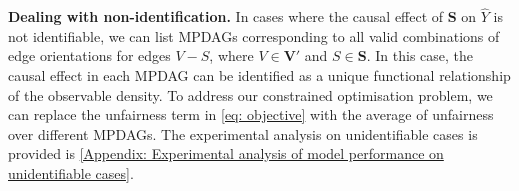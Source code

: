 \documentclass{article} %
\begin{document}
\textbf{Dealing with non-identification.} 
In cases where the causal effect of $\mathbf{S}$ on $\hat{Y}$ is not identifiable, we can list MPDAGs corresponding to all valid combinations of edge orientations for edges $V - S$, where $V \in \mathbf{V'}$ and $S \in \mathbf{S}$. In this case, the causal effect in each MPDAG can be identified as a unique functional relationship of the observable density. To address our constrained optimisation problem, we can replace the unfairness term in \cref{eq: objective} with the average of unfairness over different MPDAGs. The experimental analysis on unidentifiable cases is provided is \cref{Appendix: Experimental analysis of model performance on unidentifiable cases}.

\end{document}
